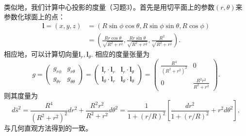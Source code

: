 \documentclass{article}
\begin{document}
类似地，我们计算中心投影的度量（习题3）。首先是用切平面上的参数$(r, \theta)$来参数化球面上的点：
\begin{equation*}
\begin{aligned}
\mathbf{l}=(x, y, z)
&=(R\sin\phi\cos\theta, R\sin\phi\sin\theta, R\cos\phi) \\
&=\left(\frac{Rr\cos\theta}{\sqrt{R^{2}+r^{2}}}, \frac{Rr\sin\theta}{\sqrt{R^{2}+r^{2}}}, \frac{R^{2}}{\sqrt{R^{2}+r^{2}}}\right).
\end{aligned}
\end{equation*}
相应地，可以计算切向量$\mathbf{l}_{r}, \mathbf{l}_\theta$.
相应的度量张量为
\begin{equation}
g=\begin{pmatrix}
g_{r\phi} & g_{r\theta} \\
g_{\theta{r}} & g_{\theta\theta}
\end{pmatrix}
=\begin{pmatrix}
\mathbf{l}_{r}\cdot\mathbf{l}_{r} & \mathbf{l}_{r}\cdot\mathbf{l}_{\theta} \\
\mathbf{l}_{\theta}\cdot\mathbf{l}_{r} & \mathbf{l}_{\theta}\cdot\mathbf{l}_{\theta}
\end{pmatrix}
=\begin{pmatrix}
\frac{R^{4}}{\left(R^{2} + r^{2}\right)^{2}} & 0 \\
0 & \frac{R^{2}r^{2}}{R^{2} + r^{2}}
\end{pmatrix}.
\end{equation}
则其度量为
\begin{equation}
d\hat{s}^{2}=\frac{R^{4}}{\left(R^{2}+r^{2}\right)^{2}}dr^{2}+\frac{R^{2}r^{2}}{R^{2}+r^{2}}d\theta^{2}
=\frac{1}{1+(r/R)^{2}}\left[\frac{dr^{2}}{1+(r/R)^{2}}+r^{2}d\theta^{2}\right],
\end{equation}
与几何直观方法得到的一致。

%
%
\end{document}
